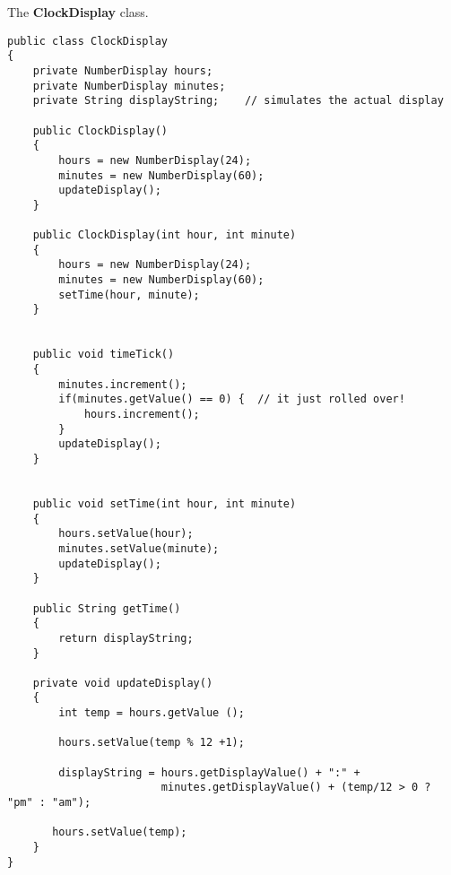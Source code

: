 \documentclass[10pt,a4paper]{article}
\begin{document}
The \textbf{ClockDisplay} class.
\begin{lstlisting}
public class ClockDisplay
{
    private NumberDisplay hours;
    private NumberDisplay minutes;
    private String displayString;    // simulates the actual display
    
    public ClockDisplay()
    {
        hours = new NumberDisplay(24);
        minutes = new NumberDisplay(60);
        updateDisplay();
    }

    public ClockDisplay(int hour, int minute)
    {
        hours = new NumberDisplay(24);
        minutes = new NumberDisplay(60);
        setTime(hour, minute);
    }


    public void timeTick()
    {
        minutes.increment();
        if(minutes.getValue() == 0) {  // it just rolled over!
            hours.increment();
        }
        updateDisplay();
    }


    public void setTime(int hour, int minute)
    {
        hours.setValue(hour);
        minutes.setValue(minute);
        updateDisplay();
    }

    public String getTime()
    {
        return displayString;
    }
    
    private void updateDisplay()
    {
        int temp = hours.getValue ();
        
        hours.setValue(temp % 12 +1);
        
        displayString = hours.getDisplayValue() + ":" + 
                        minutes.getDisplayValue() + (temp/12 > 0 ? "pm" : "am");
                        
       hours.setValue(temp);
    }
}
\end{lstlisting}
\end{document}
